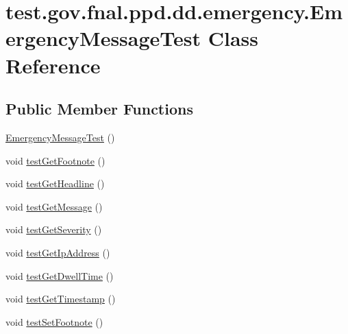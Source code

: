 \hypertarget{classtest_1_1gov_1_1fnal_1_1ppd_1_1dd_1_1emergency_1_1EmergencyMessageTest}{\section{test.\-gov.\-fnal.\-ppd.\-dd.\-emergency.\-Emergency\-Message\-Test Class Reference}
\label{classtest_1_1gov_1_1fnal_1_1ppd_1_1dd_1_1emergency_1_1EmergencyMessageTest}
}
\subsection*{Public Member Functions}
\begin{DoxyCompactItemize}
\item 
\hyperlink{classtest_1_1gov_1_1fnal_1_1ppd_1_1dd_1_1emergency_1_1EmergencyMessageTest_aa3d6148a4b3e410e30ddf435835e4373}{Emergency\-Message\-Test} ()
\item 
void \hyperlink{classtest_1_1gov_1_1fnal_1_1ppd_1_1dd_1_1emergency_1_1EmergencyMessageTest_a0e8d03d937d5f58b149d4c35a5e97650}{test\-Get\-Footnote} ()
\item 
void \hyperlink{classtest_1_1gov_1_1fnal_1_1ppd_1_1dd_1_1emergency_1_1EmergencyMessageTest_af20940230aae0ad173ea528cef5e4ef1}{test\-Get\-Headline} ()
\item 
void \hyperlink{classtest_1_1gov_1_1fnal_1_1ppd_1_1dd_1_1emergency_1_1EmergencyMessageTest_aa15cbcdea171a0fd6939d97391798365}{test\-Get\-Message} ()
\item 
void \hyperlink{classtest_1_1gov_1_1fnal_1_1ppd_1_1dd_1_1emergency_1_1EmergencyMessageTest_a35654bcc7670b89c408abddb787d5f99}{test\-Get\-Severity} ()
\item 
void \hyperlink{classtest_1_1gov_1_1fnal_1_1ppd_1_1dd_1_1emergency_1_1EmergencyMessageTest_a1ddfdd485a70264825004f4a3d468031}{test\-Get\-Ip\-Address} ()
\item 
void \hyperlink{classtest_1_1gov_1_1fnal_1_1ppd_1_1dd_1_1emergency_1_1EmergencyMessageTest_a0ceb60a6ef13391819341522fff8f643}{test\-Get\-Dwell\-Time} ()
\item 
void \hyperlink{classtest_1_1gov_1_1fnal_1_1ppd_1_1dd_1_1emergency_1_1EmergencyMessageTest_aeb0141fe66899fcba9244a6b558a5e3d}{test\-Get\-Timestamp} ()
\item 
void \hyperlink{classtest_1_1gov_1_1fnal_1_1ppd_1_1dd_1_1emergency_1_1EmergencyMessageTest_ac01cc6f4aac575f4e04aef71b420a364}{test\-Set\-Footnote} ()

\end{DoxyCompactItemize}
